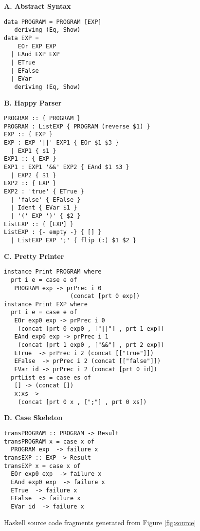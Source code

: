 \begin{figure}
\begin{boxedminipage}[t]{\textwidth}
\begin{minipage}[l]{0.5\textwidth}

\textbf{A. Abstract Syntax}
\scriptsize
\begin{verbatim}
data PROGRAM = PROGRAM [EXP]
   deriving (Eq, Show)
data EXP =
    EOr EXP EXP
  | EAnd EXP EXP
  | ETrue
  | EFalse
  | EVar
   deriving (Eq, Show)
\end{verbatim}
\normalsize
\textbf{B. Happy Parser}

\scriptsize
\begin{verbatim}
PROGRAM :: { PROGRAM }
PROGRAM : ListEXP { PROGRAM (reverse $1) } 
EXP :: { EXP }
EXP : EXP '||' EXP1 { EOr $1 $3 } 
  | EXP1 { $1 }
EXP1 :: { EXP }
EXP1 : EXP1 '&&' EXP2 { EAnd $1 $3 } 
  | EXP2 { $1 }
EXP2 :: { EXP }
EXP2 : 'true' { ETrue } 
  | 'false' { EFalse }
  | Ident { EVar $1 }
  | '(' EXP ')' { $2 }
ListEXP :: { [EXP] }
ListEXP : {- empty -} { [] } 
  | ListEXP EXP ';' { flip (:) $1 $2 }
\end{verbatim}
\normalsize
\end{minipage}
\hfill
\begin{minipage}[r]{0.5\textwidth}

\textbf{C. Pretty Printer}

\scriptsize
\begin{verbatim}
instance Print PROGRAM where
  prt i e = case e of
   PROGRAM exp -> prPrec i 0 
                   (concat [prt 0 exp])
instance Print EXP where
  prt i e = case e of
   EOr exp0 exp -> prPrec i 0 
    (concat [prt 0 exp0 , ["||"] , prt 1 exp])
   EAnd exp0 exp -> prPrec i 1 
    (concat [prt 1 exp0 , ["&&"] , prt 2 exp])
   ETrue  -> prPrec i 2 (concat [["true"]])
   EFalse  -> prPrec i 2 (concat [["false"]])
   EVar id -> prPrec i 2 (concat [prt 0 id])
  prtList es = case es of
   [] -> (concat [])
   x:xs -> 
    (concat [prt 0 x , [";"] , prt 0 xs])
\end{verbatim}
\normalsize

\textbf{D. Case Skeleton}

\scriptsize
\begin{verbatim}
transPROGRAM :: PROGRAM -> Result
transPROGRAM x = case x of
  PROGRAM exp  -> failure x
transEXP :: EXP -> Result
transEXP x = case x of
  EOr exp0 exp  -> failure x
  EAnd exp0 exp  -> failure x
  ETrue  -> failure x
  EFalse  -> failure x
  EVar id  -> failure x
\end{verbatim}
\hfill
\end{minipage}
\end{boxedminipage}
\caption{Haskell source code fragments generated from Figure \ref{fig:source}}
\label{fig:haskell}
\end{figure}

